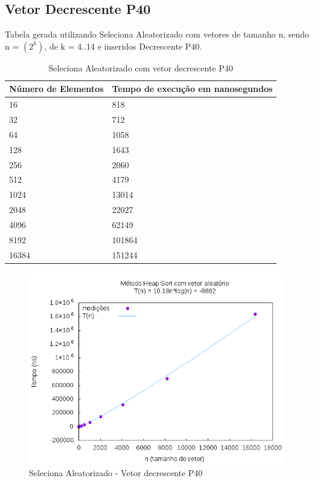 \documentclass[12pt,a4paper,twoside]{report}
\begin{document}
\subsection{Vetor Decrescente P40}
Tabela gerada utilizando Seleciona Aleatorizado com vetores de tamanho n, sendo n = $(2^k)$, de k = 4..14 e inseridos Decrescente P40.
\begin{table}[H]
\centering
\caption{Seleciona Aleatorizado com vetor decrescente P40}
\label{my-label}
\begin{tabular}{|l|l|}
\hline
\multicolumn{1}{|c|}{\textbf{Número de Elementos}} & \multicolumn{1}{c|}{\textbf{Tempo de execução em nanosegundos}} \\ \hline
16 & 818 \\ \hline
32 & 712 \\ \hline
64 & 1058 \\ \hline
128 & 1643 \\ \hline
256 & 2060 \\ \hline
512 & 4179 \\ \hline
1024 & 13014 \\ \hline
2048 & 22027 \\ \hline
4096 & 62149 \\ \hline
8192 & 101864 \\ \hline
16384 & 151244 \\ \hline

\end{tabular}
\end{table}

\begin{figure}[H]
    \centering
    \includegraphics[width=0.7\linewidth]{graficos/HeapSort/vIntAleatorio/vIntAleatorio.png}
  \caption{Seleciona Aleatorizado - Vetor decrescente P40}
\end{figure}
\end{document}
